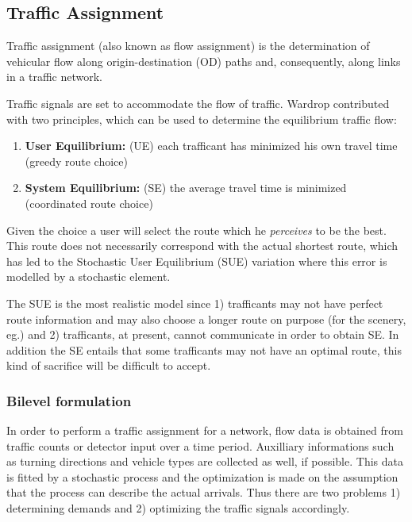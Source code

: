\subsection{Traffic Assignment}
\label{sec:usereq}

Traffic assignment (also known as flow assignment) is the
determination of vehicular flow along origin-destination (OD) paths
and, consequently, along links in a traffic network.

Traffic signals are set to accommodate the flow of traffic. Wardrop
contributed with two principles, which can be used to determine the
equilibrium traffic flow:

\begin{enumerate}
\item \textbf{User Equilibrium:} (UE) each trafficant has minimized his own travel time (greedy route choice)
\item \textbf{System Equilibrium:} (SE) the average travel time is minimized (coordinated route choice)
\end{enumerate}

Given the choice a user will select the route which he
\textit{perceives} to be the best. This route does not necessarily
correspond with the actual shortest route, which has led to the
Stochastic User Equilibrium (SUE) variation \cite{32} where this error
is modelled by a stochastic element.

The SUE is the most realistic model since 1) trafficants may not have
perfect route information and may also choose a longer route on
purpose (for the scenery, eg.) and 2) trafficants, at present, cannot
communicate in order to obtain SE. In addition the SE entails that
some trafficants may not have an optimal route, this kind of sacrifice
will be difficult to accept.

\subsubsection*{Bilevel formulation}
\label{sec:bilevel}

In order to perform a traffic assignment for a network, flow data is
obtained from traffic counts or detector input over a time
period. Auxilliary informations such as turning directions and vehicle
types are collected as well, if possible. This data is fitted by a
stochastic process and the optimization is made on the assumption that
the process can describe the actual arrivals. Thus there are two
problems 1) determining demands and 2) optimizing the traffic signals
accordingly.

